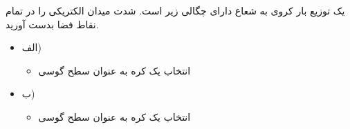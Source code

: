 \begin{ELexample}{}

یک توزیع بار کروی به شعاع  دارای چگالی زیر است. شدت میدان الکتریکی را در تمام نقاط فضا بدست آورید.


\begin{ELsolution}


\begin{itemize}
\tightlist
\item
  الف) 

  \begin{itemize}
  \tightlist
  \item
    انتخاب یک کره به عنوان سطح گوسی
  \end{itemize}
\end{itemize}


\begin{itemize}
\tightlist
\item
  ب) 

  \begin{itemize}
  \tightlist
  \item
    انتخاب یک کره به عنوان سطح گوسی
  \end{itemize}
\end{itemize}


\end{ELsolution}

\end{ELexample}

\ELhold

